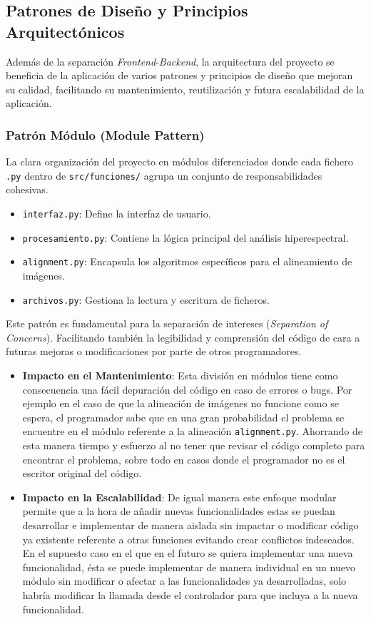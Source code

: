\subsection{Patrones de Diseño y Principios Arquitectónicos}
Además de la separación \textit{Frontend}-\textit{Backend}, la arquitectura del proyecto se beneficia de la aplicación de varios patrones y principios de diseño que mejoran su calidad, facilitando su mantenimiento, reutilización y futura escalabilidad de la aplicación.

\subsubsection{Patrón Módulo (Module Pattern)}
La clara organización del proyecto en módulos diferenciados donde cada fichero \texttt{.py} dentro de \texttt{src/funciones/} agrupa un conjunto de responsabilidades cohesivas.
\begin{itemize}
    \item \texttt{interfaz.py}: Define la interfaz de usuario.
    \item \texttt{procesamiento.py}: Contiene la lógica principal del análisis hiperespectral.
    \item \texttt{alignment.py}: Encapsula los algoritmos específicos para el alineamiento de imágenes.
    \item \texttt{archivos.py}: Gestiona la lectura y escritura de ficheros.
\end{itemize}
Este patrón es fundamental para la separación de intereses (\textit{Separation of Concerns}). Facilitando también la legibilidad y comprensión del código de cara a futuras mejoras o modificaciones por parte de otros programadores.

\begin{itemize}
    \item \textbf{Impacto en el Mantenimiento}: Esta división en módulos tiene como consecuencia una fácil depuración del código en caso de errores o bugs. Por ejemplo en el caso de que la alineación de imágenes no funcione como se espera, el programador sabe que en una gran probabilidad el problema se encuentre en el módulo referente a la alineación \texttt{alignment.py}. Ahorrando de esta manera tiempo y esfuerzo al no tener que revisar el código completo para encontrar el problema, sobre todo en casos donde el programador no es el escritor original del código.

    \item \textbf{Impacto en la Escalabilidad}: De igual manera este enfoque modular permite que a la hora de añadir nuevas funcionalidades estas se puedan desarrollar e implementar de manera aislada sin impactar o modificar código ya existente referente a otras funciones evitando crear conflictos indeseados. En el supuesto caso en el que en el futuro se quiera implementar una nueva funcionalidad, ésta se puede implementar de manera individual en un nuevo módulo sin modificar o afectar a las funcionalidades ya desarrolladas, solo habría modificar la llamada desde el controlador para que incluya a la nueva funcionalidad.
\end{itemize}

